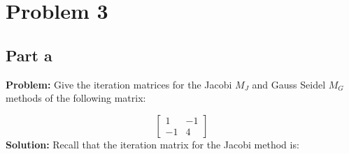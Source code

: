 \documentclass{article}
\begin{document}
\section*{Problem 3}
\subsection*{Part a}
\textbf{Problem:} Give the iteration matrices for the Jacobi $M_J$ and Gauss Seidel $M_G$ methods of the following matrix:

$$\begin{bmatrix}
1&-1\\-1&4
\end{bmatrix}$$
\newpage
\textbf{Solution:} Recall that the iteration matrix for the Jacobi method is:

\end{document}
